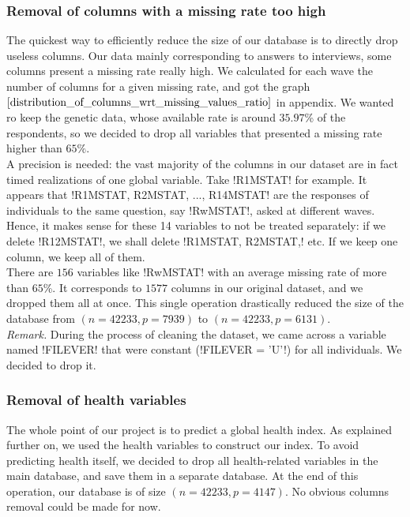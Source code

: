 \documentclass[]{article}
\begin{document}
\subsubsection{Removal of columns with a missing rate too high}
The quickest way to efficiently reduce the size of our database is to directly drop useless columns. Our data mainly corresponding to answers to interviews, some columns present a missing rate really high. We calculated for each wave the number of columns for a given missing rate, and got the graph $\ref{distribution_of_columns_wrt_missing_values_ratio}$ in appendix. We wanted ro keep the genetic data, whose available rate is around $35.97$\% of the respondents, so we decided to drop all variables that presented a missing rate higher than $65\%$.\\
A precision is needed: the vast majority of the columns in our dataset are in fact timed realizations of one global variable. Take \pyth!R1MSTAT! for example. It appears that \pyth!R1MSTAT, R2MSTAT, ..., R14MSTAT! are the responses of individuals to the same question, say \pyth!RwMSTAT!, asked at different waves. Hence, it makes sense for these 14 variables to not be treated separately: if we delete \pyth!R12MSTAT!, we shall delete \pyth!R1MSTAT, R2MSTAT,! etc. If we keep one column, we keep all of them.\\
There are $156$ variables like \pyth!RwMSTAT! with an average missing rate of more than $65$\%. It corresponds to $1577$ columns in our original dataset, and we dropped them all at once. This single operation drastically reduced the size of the database from $(n = 42233, p = 7939)$ to $(n = 42233, p = 6131)$.\\

\noindent
\textit{Remark.} During the process of cleaning the dataset, we came across a variable named \pyth!FILEVER! that were constant (\pyth!FILEVER = 'U'!) for all individuals. We decided to drop it.

\subsubsection{Removal of health variables}
The whole point of our project is to predict a global health index. As explained further on, we used the health variables to construct our index. To avoid predicting health itself, we decided to drop all health-related variables in the main database, and save them in a separate database. At the end of this operation, our database is of size $(n = 42233, p = 4147)$. No obvious columns removal could be made for now.
\end{document}
